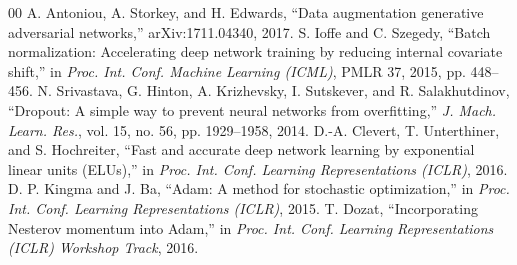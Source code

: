 \documentclass[conference]{IEEEtran}
\begin{document}
\begin{thebibliography}{00}
 A. Antoniou, A. Storkey, and H. Edwards, ``Data augmentation generative adversarial networks,'' arXiv:1711.04340, 2017.
 S. Ioffe and C. Szegedy, ``Batch normalization: Accelerating deep network training by reducing internal covariate shift,'' in \emph{Proc. Int. Conf. Machine Learning (ICML)}, PMLR 37, 2015, pp. 448--456.
 N. Srivastava, G. Hinton, A. Krizhevsky, I. Sutskever, and R. Salakhutdinov, ``Dropout: A simple way to prevent neural networks from overfitting,'' \emph{J. Mach. Learn. Res.}, vol. 15, no. 56, pp. 1929--1958, 2014.
 D.-A. Clevert, T. Unterthiner, and S. Hochreiter, ``Fast and accurate deep network learning by exponential linear units (ELUs),'' in \emph{Proc. Int. Conf. Learning Representations (ICLR)}, 2016.
 D. P. Kingma and J. Ba, ``Adam: A method for stochastic optimization,'' in \emph{Proc. Int. Conf. Learning Representations (ICLR)}, 2015.
 T. Dozat, ``Incorporating Nesterov momentum into Adam,'' in \emph{Proc. Int. Conf. Learning Representations (ICLR) Workshop Track}, 2016.
\end{thebibliography}
\end{document}
